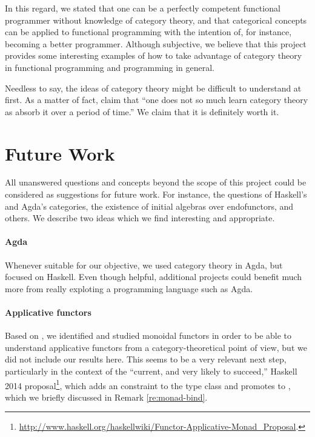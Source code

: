 In this regard, we stated that one can be a perfectly competent
functional programmer without knowledge of category theory, and that
categorical concepts can be applied to functional programming with the
intention of, for instance, becoming a better programmer. Although
subjective, we believe that this project provides some interesting
examples of how to take advantage of category theory in functional
programming and programming in general.

Needless to say, the ideas of category theory might be difficult to
understand at first. As a matter of fact,
\textcite[25]{bird-demoor-1997} claim that ``one does not so much
learn category theory as absorb it over a period of time.'' We claim
that it is definitely worth it.

\section{Future Work}

All unanswered questions and concepts beyond the scope of this project
could be considered as suggestions for future work. For instance, the
questions of Haskell's and Agda's categories, the existence of initial
algebras over endofunctors, and others. We describe two ideas which we
find interesting and appropriate.

\paragraph{Agda}

Whenever suitable for our objective, we used category theory in Agda,
but focused on Haskell. Even though helpful, additional projects could
benefit much more from really exploting a programming language such as
Agda.

\paragraph{Applicative functors}

Based on \parencite{mcbride-paterson-2008}, we identified and studied
monoidal functors in order to be able to understand applicative
functors from a category-theoretical point of view, but we did not
include our results here. This seems to be a very relevant next step,
particularly in the context of the ``current, and very likely to
succeed,'' Haskell 2014 
proposal\footnote{\url{http://www.haskell.org/haskellwiki/Functor-Applicative-Monad_Proposal}.},
which adds an  constraint to the
 type class and promotes  to
, which we briefly discussed in Remark
\ref{re:monad-bind}.

\clearemptydoublepage
